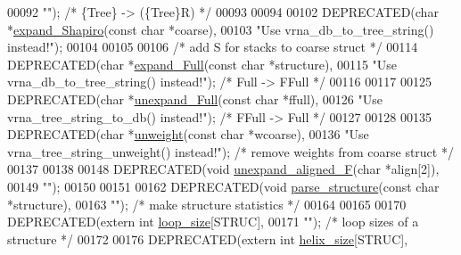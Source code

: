 \begin{DoxyCode}
00092            \textcolor{stringliteral}{""});                   \textcolor{comment}{/* \{Tree\} -> (\{Tree\}R)          */}
00093 
00094 
00102 DEPRECATED(\textcolor{keywordtype}{char} *\hyperlink{group__struct__utils__deprecated_gabe3d815b420dc4553bfb23511198b4c6}{expand\_Shapiro}(\textcolor{keyword}{const} \textcolor{keywordtype}{char} *coarse),
00103            \textcolor{stringliteral}{"Use vrna\_db\_to\_tree\_string() instead!"});
00104 
00105 
00106 \textcolor{comment}{/* add S for stacks to coarse struct */}
00114 DEPRECATED(\textcolor{keywordtype}{char} *\hyperlink{group__struct__utils__deprecated_ga78d73cd54a068ef2812812771cdddc6f}{expand\_Full}(\textcolor{keyword}{const} \textcolor{keywordtype}{char} *structure),
00115            \textcolor{stringliteral}{"Use vrna\_db\_to\_tree\_string() instead!"});       \textcolor{comment}{/* Full   -> FFull         */}
00116 
00117 
00125 DEPRECATED(\textcolor{keywordtype}{char} *\hyperlink{group__struct__utils__deprecated_ga260c4b622093b76a883bf96628280de1}{unexpand\_Full}(\textcolor{keyword}{const} \textcolor{keywordtype}{char} *ffull),
00126            \textcolor{stringliteral}{"Use vrna\_tree\_string\_to\_db() instead!"});         \textcolor{comment}{/* FFull  -> Full          */}
00127 
00128 
00135 DEPRECATED(\textcolor{keywordtype}{char} *\hyperlink{group__struct__utils__deprecated_ga09a80253ac7b6bae606871ba7c6e5136}{unweight}(\textcolor{keyword}{const} \textcolor{keywordtype}{char} *wcoarse),
00136            \textcolor{stringliteral}{"Use vrna\_tree\_string\_unweight() instead!"});            \textcolor{comment}{/* remove weights from coarse struct */}
00137 
00138 
00148 DEPRECATED(\textcolor{keywordtype}{void}   \hyperlink{group__struct__utils__deprecated_ga1054c4477d53b31d79d4cb132100e87a}{unexpand\_aligned\_F}(\textcolor{keywordtype}{char} *align[2]),
00149            \textcolor{stringliteral}{""});
00150 
00151 
00162 DEPRECATED(\textcolor{keywordtype}{void}   \hyperlink{group__struct__utils__deprecated_ga3c79042e6bf6f01706bf30ec9e69e8ac}{parse\_structure}(\textcolor{keyword}{const} \textcolor{keywordtype}{char} *structure),
00163            \textcolor{stringliteral}{""});  \textcolor{comment}{/* make structure statistics */}
00164 
00165 
00170 DEPRECATED(\textcolor{keyword}{extern} \textcolor{keywordtype}{int} \hyperlink{group__struct__utils__deprecated_ga365a3fad38b21ca8606cb556f2896218}{loop\_size}[STRUC],
00171            \textcolor{stringliteral}{""});         \textcolor{comment}{/* loop sizes of a structure */}
00172 
00176 DEPRECATED(\textcolor{keyword}{extern} \textcolor{keywordtype}{int} \hyperlink{group__struct__utils__deprecated_ga3fce53616c021cbc724fc80b8c1ebeb5}{helix\_size}[STRUC],

\end{DoxyCode}
